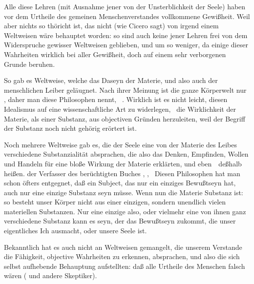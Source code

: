 Alle diese Lehren (mit Ausnahme jener von der Unsterblichkeit der Seele) haben vor dem Urtheile des gemeinen Menschenverstandes vollkommene Gewißheit. Weil aber nichts so thöricht ist, das nicht (wie Cicero sagt) von irgend einem Weltweisen wäre behauptet worden: so sind auch keine jener Lehren frei von dem Widerspruche gewisser Weltweisen geblieben, und um so weniger, da einige dieser Wahrheiten wirklich bei aller Gewißheit, doch auf einem sehr verborgenen Grunde beruhen.
\begin{aufza}
\item So gab es Weltweise, welche das Daseyn der Materie, und also auch der menschlichen Leiber geläugnet. Nach ihrer Meinung ist die ganze Körperwelt nur , daher man diese Philosophen  nennt, \zB\ . Wirklich ist es nicht leicht, diesen Idealismus auf eine wissenschaftliche Art zu widerlegen, \dh\ die Wirklichkeit der Materie, als einer Substanz, aus objectiven Gründen herzuleiten, weil der Begriff der Substanz noch nicht gehörig erörtert ist.
\item Noch mehrere Weltweise gab es, die der Seele eine von der Materie des Leibes verschiedene Substanzialität absprachen, die also das Denken, Empfinden, Wollen und Handeln für eine bloße Wirkung der Materie erklärten, und eben~\ deßhalb  heißen.  der Verfasser des berüchtigten Buches , , \uA\ Diesen Philosophen hat man schon öfters entgegnet, daß ein Subject, das nur ein einziges Bewußtseyn hat, auch nur eine einzige Substanz seyn müsse. Wenn nun die Materie Substanz ist: so besteht unser Körper nicht aus einer einzigen, sondern unendlich vielen materiellen Substanzen. Nur eine einzige also, oder vielmehr eine von ihnen ganz verschiedene Substanz kann es seyn, der das Bewußtseyn zukommt, die unser eigentliches Ich ausmacht, oder unsere Seele ist.
\item Bekanntlich hat es auch nicht an Weltweisen gemangelt, die unserem Verstande die Fähigkeit, objective Wahrheiten zu erkennen, absprachen, und also die sich selbst aufhebende Behauptung aufstellten: daß alle Urtheile des Menschen falsch wären ( und andere Skeptiker).

\end{aufza}
